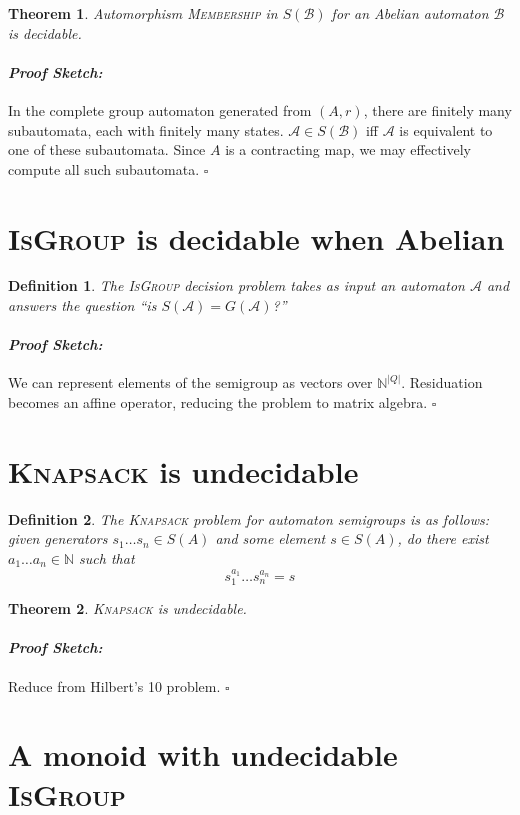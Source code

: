 \documentclass[a0]{a0poster}
\newcommand{\decprob}[1]{\textsc{#1}}
\newcommand{\N}{\mathbb{N}}
\newcommand{\A}{\mathcal{A}}
\newcommand{\B}{\mathcal{B}}
\theoremstyle{pleasant}
\newtheorem{theorem}{Theorem}
\newtheorem{definition}{Definition}
\newenvironment{proofsketch}{\paragraph{\large \normalfont \textit{Proof Sketch:}}}{\hfill$\square$}
\newcommand{\0}{\underline{0}}
\newcommand{\1}{\underline{1}}
\newcommand{\2}{\underline{2}}
\begin{document}
\begin{multicols}{3}
\begin{theorem}
  Automorphism \decprob{Membership} in $S(\B)$ for an Abelian
  automaton $\B$ is decidable.
\end{theorem}

\begin{proofsketch}
  In the complete group automaton generated from $(A,r)$, there are
  finitely many subautomata, each with finitely many states.
  $\A \in S(\B)$ iff $\A$ is equivalent to one of these subautomata.
  Since $A$ is a contracting map, we may effectively compute all such
  subautomata.
\end{proofsketch}

\section*{\textsc{IsGroup} is decidable when Abelian}

\begin{definition}
  The \decprob{IsGroup} decision problem takes as input an automaton
  $\A$ and answers the question ``is $S(\A) = G(\A)$?''
\end{definition}

\begin{proofsketch} 
  We can represent elements of the semigroup as vectors over
  $\mathbb{N}^{|Q|}$. Residuation becomes an affine operator, reducing
  the problem to matrix algebra.
\end{proofsketch} 

\section*{\textsc{Knapsack} is undecidable}

\begin{definition}
  The \textsc{Knapsack} problem for automaton semigroups is as
  follows: given generators $s_1\ldots s_n \in S(A)$ and some element
  $s \in S(A)$, do there exist $a_1\ldots a_n \in \N$ such
  that \[s_1^{a_1}\ldots s_n^{a_n} = s \]
\end{definition}

\begin{theorem}
  \textsc{Knapsack} is undecidable.
\end{theorem}

\begin{proofsketch}
  Reduce from Hilbert's 10 problem.
\end{proofsketch}

\section*{A monoid with undecidable \textsc{IsGroup}}


\end{multicols}
\end{document}
